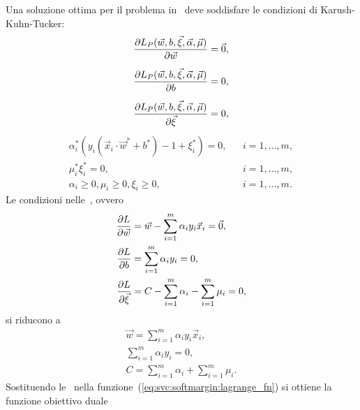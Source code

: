 %
Una soluzione ottima per il problema in~ deve soddisfare le condizioni di Karush-Kuhn-Tucker:
\begin{align}
    \label{eq:svc:softmargin:kkt1}
    \frac{\partial{L_P(\Vec{w},b, \Vec{\xi}, \Vec{\alpha}, \Vec{\mu})}}{\partial{\Vec{w}}} = \Vec{0},  \\[2mm]
    \label{eq:svc:softmargin:kkt2}
    \frac{\partial{L_P(\Vec{w},b, \Vec{\xi}, \Vec{\alpha}, \Vec{\mu})}}{\partial{b}} = 0, \\[2mm]
    \label{eq:svc:softmargin:kkt3}
    \frac{\partial{L_P(\Vec{w},b, \Vec{\xi}, \Vec{\alpha}, \Vec{\mu})}}{\partial{\Vec{\xi}}} = 0, 
\end{align}
\begin{align}
    \label{eq:svc:softmargin:kkt4}
    \alpha_i^*(y_i(\Vec{x}_i\cdot\Vec{w}^*+b^*)-1+\xi_i^*) = 0,  && i=1,\dots,m, \\[2mm] 
    \label{eq:svc:softmargin:kkt5}
    \mu_i^*\xi_i^* = 0, && i=1,\dots,m, \\[2mm] 
    \label{eq:svc:softmargin:kkt6}
    \alpha_i \geq 0, \mu_i \geq 0, \xi_i \geq 0, && i=1,\dots,m.
\end{align}
Le condizioni nelle~, ovvero
\begin{equation*}
    \begin{split}
        \frac{\partial{L}}{\partial{\Vec{w}}} & = \Vec{w} - \sum_{i=1}^{m}\alpha_iy_i\Vec{x}_i = \Vec{0},\\
        \frac{\partial{L}}{\partial{b}} &=  \sum_{i=1}^{m}\alpha_iy_i = 0,\\
        \frac{\partial{L}}{\partial{\Vec{\xi}}} &= C -\sum_{i=1}^{m}\alpha_i - \sum_{i=1}^{m}\mu_i = 0,
    \end{split}
\end{equation*}
si riducono a
\begin{align} 
    \label{eq:svc_hard_sub1}
    \Vec{w} = \sum_{i=1}^{m}\alpha_iy_i\Vec{x}_i,  \\[2mm]
    \label{eq:svc_hard_sub2}
    \sum_{i=1}^{m}\alpha_iy_i = 0, \\[2mm]
    \label{eq:svc_hard_sub3}
    C = \sum_{i=1}^{m}\alpha_i + \sum_{i=1}^{m}\mu_i.
\end{align}
Sostituendo le~ nella funzione~(\ref{eq:svc:softmargin:lagrange_fn}) si ottiene la funzione obiettivo duale
